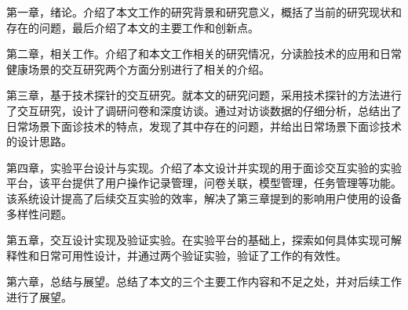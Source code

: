 第一章，绪论。介绍了本文工作的研究背景和研究意义，概括了当前的研究现状和存在的问题，最后介绍了本文的主要工作和创新点。

第二章，相关工作。介绍了和本文工作相关的研究情况，分读脸技术的应用和日常健康场景的交互研究两个方面分别进行了相关的介绍。

第三章，基于技术探针的交互研究。就本文的研究问题，采用技术探针的方法进行了交互研究，设计了调研问卷和深度访谈。通过对访谈数据的仔细分析，总结出了日常场景下面诊技术的特点，发现了其中存在的问题，并给出日常场景下面诊技术的设计思路。

第四章，实验平台设计与实现。介绍了本文设计并实现的用于面诊交互实验的实验平台，该平台提供了用户操作记录管理，问卷关联，模型管理，任务管理等功能。该系统设计提高了后续交互实验的效率，解决了第三章提到的影响用户使用的设备多样性问题。

第五章，交互设计实现及验证实验。在实验平台的基础上，探索如何具体实现可解释性和日常可用性设计，并通过两个验证实验，验证了工作的有效性。

第六章，总结与展望。总结了本文的三个主要工作内容和不足之处，并对后续工作进行了展望。